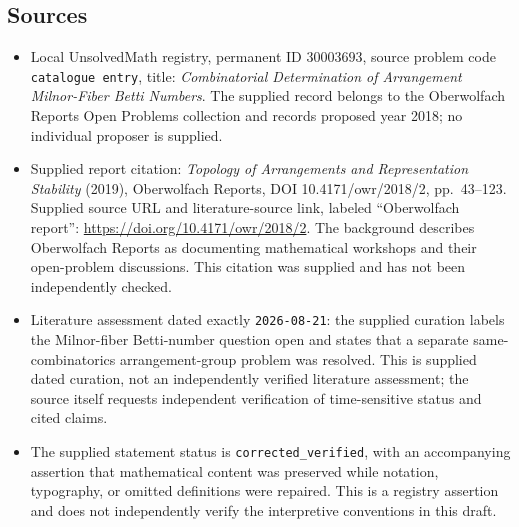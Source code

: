 \documentclass[11pt]{article}
\begin{document}
\subsection{Sources}
\begin{itemize}
\item Local UnsolvedMath registry, permanent ID \(30003693\), source problem code \texttt{catalogue entry}, title: \emph{Combinatorial Determination of Arrangement Milnor-Fiber Betti Numbers}. The supplied record belongs to the Oberwolfach Reports Open Problems collection and records proposed year 2018; no individual proposer is supplied.
\item Supplied report citation: \emph{Topology of Arrangements and Representation Stability} (2019), Oberwolfach Reports, DOI 10.4171/owr/2018/2, pp.\ 43--123. Supplied source URL and literature-source link, labeled ``Oberwolfach report'': \url{https://doi.org/10.4171/owr/2018/2}. The background describes Oberwolfach Reports as documenting mathematical workshops and their open-problem discussions. This citation was supplied and has not been independently checked.
\item Literature assessment dated exactly \texttt{2026-08-21}: the supplied curation labels the Milnor-fiber Betti-number question open and states that a separate same-combinatorics arrangement-group problem was resolved. This is supplied dated curation, not an independently verified literature assessment; the source itself requests independent verification of time-sensitive status and cited claims.
\item The supplied statement status is \texttt{corrected\_verified}, with an accompanying assertion that mathematical content was preserved while notation, typography, or omitted definitions were repaired. This is a registry assertion and does not independently verify the interpretive conventions in this draft.
\end{itemize}
\end{document}
